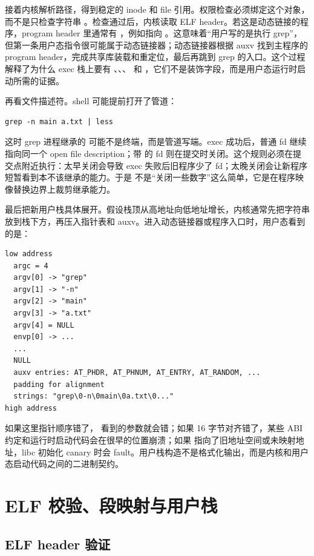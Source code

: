 接着内核解析路径，得到稳定的 inode 和 file 引用。权限检查必须绑定这个对象，而不是只检查字符串 。检查通过后，内核读取 ELF header。若这是动态链接的程序，program header 里通常有 ，例如指向 。这意味着“用户写的是执行 grep”，但第一条用户态指令很可能属于动态链接器；动态链接器根据 auxv 找到主程序的 program header，完成共享库装载和重定位，最后再跳到 grep 的入口。这个过程解释了为什么 exec 栈上要有 、、、 和 ，它们不是装饰字段，而是用户态运行时启动所需的证据。

再看文件描述符。shell 可能提前打开了管道：

\begin{lstlisting}
grep -n main a.txt | less
\end{lstlisting}

这时 grep 进程继承的  可能不是终端，而是管道写端。exec 成功后，普通 fd 继续指向同一个 open file description；带  的 fd 则在提交时关闭。这个规则必须在提交点附近执行：太早关闭会导致 exec 失败后旧程序少了 fd；太晚关闭会让新程序短暂看到本不该继承的能力。于是  不是“关闭一些数字”这么简单，它是在程序映像替换边界上裁剪继承能力。

最后把新用户栈具体展开。假设栈顶从高地址向低地址增长，内核通常先把字符串放到栈下方，再压入指针表和 auxv。进入动态链接器或程序入口时，用户态看到的是：

\begin{lstlisting}
low address
  argc = 4
  argv[0] -> "grep"
  argv[1] -> "-n"
  argv[2] -> "main"
  argv[3] -> "a.txt"
  argv[4] = NULL
  envp[0] -> ...
  ...
  NULL
  auxv entries: AT_PHDR, AT_PHNUM, AT_ENTRY, AT_RANDOM, ...
  padding for alignment
  strings: "grep\0-n\0main\0a.txt\0..."
high address
\end{lstlisting}

如果这里指针顺序错了， 看到的参数就会错；如果 16 字节对齐错了，某些 ABI 约定和运行时启动代码会在很早的位置崩溃；如果  指向了旧地址空间或未映射地址，libc 初始化 canary 时会 fault。用户栈构造不是格式化输出，而是内核和用户态启动代码之间的二进制契约。

\section{ELF 校验、段映射与用户栈}

\subsection{ELF header 验证}

